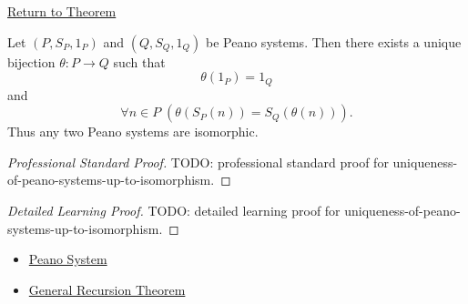 \newpage
{}
\label{prf:uniqueness-of-peano-systems-up-to-isomorphism}

\begin{remark*}[Return]
\hyperref[thm:uniqueness-of-peano-systems-up-to-isomorphism]{Return to Theorem}
\end{remark*}

\begin{theorem*}
Let $(P,S_P,1_P)$ and $(Q,S_Q,1_Q)$ be Peano systems. Then there exists a
unique bijection $\theta:P\to Q$ such that
\[
\theta(1_P)=1_Q
\]
and
\[
\forall n\in P\;(\theta(S_P(n))=S_Q(\theta(n))).
\]
Thus any two Peano systems are isomorphic.
\end{theorem*}

\begin{proof}[Professional Standard Proof]
\LRAProofBodyStart
TODO: professional standard proof for uniqueness-of-peano-systems-up-to-isomorphism.
\end{proof}

\begin{proof}[Detailed Learning Proof]
\LRAProofBodyStart
TODO: detailed learning proof for uniqueness-of-peano-systems-up-to-isomorphism.
\end{proof}

\begin{remark*}
\end{remark*}

\begin{dependencies}
\begin{itemize}
  \item \hyperref[def:peano-system]{Peano System}
  \item \hyperref[thm:general-recursion-theorem-for-peano-system]{General Recursion Theorem}
\end{itemize}
\end{dependencies}

\clearpage

